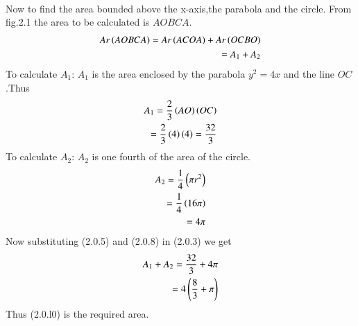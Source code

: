 \documentclass[journal,12pt,twocolumn]{IEEEtran}
\begin{document}
\\
Now to find the area bounded above the x-axis,the parabola and the circle.
From fig.2.1 the area to be calculated is $AOBCA$.
\begin{align}
Ar\left(AOBCA\right) = Ar\left(ACOA\right) + Ar\left(OCBO\right)
\\
= A_{1} + A_{2}
\end{align}
To calculate $A_{1}$:
$A_{1}$ is the area enclosed by the parabola $y^2=4x$ and the line $OC$.Thus
\begin{align}
    A_{1} = \frac{2}{3}\left(AO\right)\left(OC\right)
    \\
    = \frac{2}{3}\left(4\right)\left(4\right) = \frac{32}{3}
\end{align}
To calculate $A_{2}$: $A_{2}$ is one fourth of the area of the circle.
\begin{align}
    A_{2} = \frac{1}{4}\left(\pi r^2\right)
    \\
    = \frac{1}{4}\left(16\pi\right)
    \\
    = 4\pi
\end{align}
Now substituting (2.0.5) and (2.0.8) in (2.0.3) we get
\begin{align}
    A_{1} + A_{2} = \frac{32}{3} + 4\pi
    \\
    = 4\left(\frac{8}{3} + \pi\right) 
\end{align}
Thus (2.0.l0) is the required area.
\end{document}
